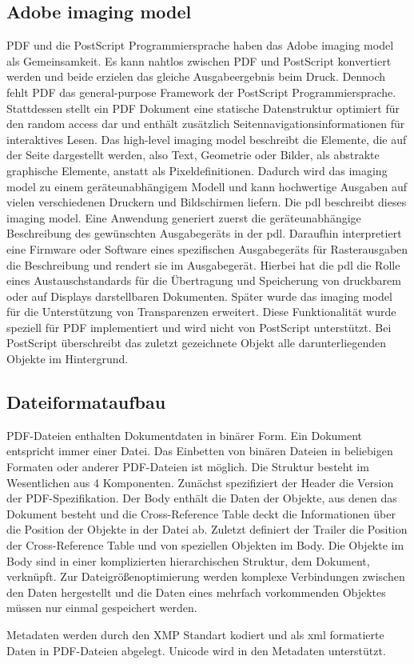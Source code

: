 \subsection{Adobe imaging model}
PDF und die PostScript Programmiersprache haben das Adobe imaging model als Gemeinsamkeit. Es kann nahtlos zwischen PDF und PostScript konvertiert werden und beide erzielen das gleiche Ausgabeergebnis beim Druck. Dennoch fehlt PDF das general-purpose Framework der PostScript Programmiersprache. Stattdessen stellt ein PDF Dokument eine statische Datenstruktur optimiert für den random access dar und enthält zusätzlich Seitennavigationsinformationen für interaktives Lesen. Das high-level imaging model beschreibt die Elemente, die auf der Seite dargestellt werden, also Text, Geometrie oder Bilder, als abstrakte graphische Elemente, anstatt als Pixeldefinitionen. Dadurch wird das imaging model zu einem geräteunabhängigem Modell und kann hochwertige Ausgaben auf vielen verschiedenen Druckern und Bildschirmen liefern. Die \gls{pdl} beschreibt dieses imaging model. Eine Anwendung generiert zuerst die geräteunabhängige Beschreibung des gewünschten Ausgabegeräts in der \gls{pdl}. Daraufhin interpretiert eine Firmware oder Software eines spezifischen Ausgabegeräts für Rasterausgaben die Beschreibung und rendert sie im Ausgabegerät. Hierbei hat die \gls{pdl} die Rolle eines Austauschstandards für die Übertragung und Speicherung von druckbarem oder auf Displays darstellbaren Dokumenten. \cite{adobe-postscript} Später wurde das imaging model für die Unterstützung von Transparenzen erweitert. Diese Funktionalität wurde speziell für PDF implementiert und wird nicht von PostScript unterstützt. Bei PostScript überschreibt das zuletzt gezeichnete Objekt alle darunterliegenden Objekte im Hintergrund. \cite{schneeberger}

\subsection{Dateiformataufbau}
PDF-Dateien enthalten Dokumentdaten in binärer Form. Ein Dokument entspricht immer einer Datei. Das Einbetten von binären Dateien in beliebigen Formaten oder anderer PDF-Dateien ist möglich. Die Struktur besteht im Wesentlichen aus 4 Komponenten. Zunächst spezifiziert der Header die Version der PDF-Spezifikation. Der Body enthält die Daten der Objekte, aus denen das Dokument besteht und die Cross-Reference Table deckt die Informationen über die Position der Objekte in der Datei ab. Zuletzt definiert der Trailer die Position der Cross-Reference Table und von speziellen Objekten im Body. Die Objekte im Body sind in einer komplizierten hierarchischen Struktur, dem Dokument, verknüpft. Zur Dateigrößenoptimierung werden komplexe Verbindungen zwischen den Daten hergestellt und die Daten eines mehrfach vorkommenden Objektes müssen nur einmal gespeichert werden. \cite{softx}
\par
Metadaten werden durch den XMP Standart kodiert und als \gls{xml} formatierte Daten in PDF-Dateien abgelegt. Unicode wird in den Metadaten unterstützt. \cite{softx} \\

